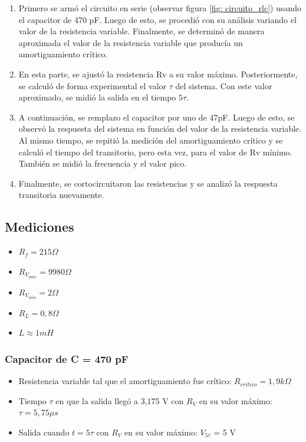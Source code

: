 \documentclass{article}
\begin{document}
    \begin{enumerate}
        \item Primero se armó el circuito en serie (observar figura \ref{fig: circuito_rlc}) usando el capacitor de 470 pF. Luego de esto, se procedió con su análisis variando el valor de la resistencia variable. Finalmente, se determinó de manera aproximada el valor de la resistencia variable que producía un amortiguamiento crítico.
        \item En esta parte, se ajustó la resistencia Rv a su valor máximo. Posteriormente, se calculó de forma experimental el valor $\tau$ del sistema. Con este valor aproximado, se midió la salida en el tiempo $ 5\tau$.
        \item A continuación, se remplazo el capacitor por uno de 47pF. Luego de esto, se observó la respuesta del sistema en función del valor de la resistencia variable. Al mismo tiempo, se repitió la medición del amortiguamiento crítico y se calculó el tiempo del transitorio, pero esta vez, para el valor de Rv mínimo. También se midió la frecuencia y el valor pico.
        \item Finalmente, se cortocircuitaron las resistencias y se analizó la respuesta transitoria nuevamente.
        
    \end{enumerate}
    \subsection{Mediciones}
 
        \begin{itemize}
            \item $ R_f = 215 \Omega $
            \item $ R_{V_{max}} = 9980 \Omega $
            \item $ R_{V_{min}} = 2 \Omega $
            \item $ R_L = 0,8 \Omega $
            \item $ L \approx 1 mH $
        \end{itemize}
        
        \par
        \subsubsection*{Capacitor de C = 470 pF}
            \begin{itemize}
                \item Resistencia variable tal que el amortiguamiento fue crítico: $ R_{critico} = 1,9 k\Omega $ %
                \item Tiempo $\tau$ en que la salida llegó a 3,175 V con $ R_V $ en su valor máximo: $ \tau = 5,75 \mu s$ %
                \item Salida cuando $t=5\tau$ con $ R_V $ en su valor máximo: $V_{5\tau}$ = 5 V%
            \end{itemize}
\end{document}
